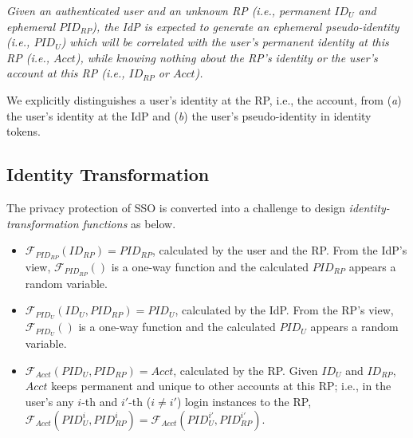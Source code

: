\emph{Given an authenticated user and an unknown RP (i.e., permanent $ID_U$ and ephemeral $PID_{RP}$),
    the IdP is expected to generate an ephemeral pseudo-identity (i.e., $PID_{U}$)
     which will be correlated with the user's permanent identity at this RP (i.e., $Acct$),
     while knowing nothing about the RP's identity or the user's account at this RP (i.e., $ID_{RP}$ or $Acct$).}


We explicitly distinguishes a user's identity at the RP, i.e., the account,
     from (\emph{a}) the user's identity at the IdP and (\emph{b}) the user's pseudo-identity in identity tokens.


\subsection{Identity Transformation}
\label{subsec:solutions}



The privacy protection of SSO is converted into a challenge
 to design \emph{identity-transformation functions} as below.
\vspace{-\topsep}\begin{itemize}
\setlength{\topsep}{0pt}
\setlength{\partopsep}{0pt}
\setlength{\itemsep}{0pt}
\setlength{\parsep}{0pt}
\setlength{\parskip}{0pt}
\item
$\mathcal{F}_{PID_{RP}}(ID_{RP}) = PID_{RP}$, calculated by the user and the RP.
From the IdP's view,
$\mathcal{F}_{PID_{RP}}()$ is a one-way function and the calculated $PID_{RP}$ appears a random variable.
\item
$\mathcal{F}_{PID_U}(ID_U, PID_{RP}) = PID_{U}$, calculated by the IdP.
From the RP's view,
    $\mathcal{F}_{PID_U}()$ is a one-way function and the calculated $PID_{U}$ appears a random variable.
\item
$\mathcal{F}_{Acct}(PID_{U}, PID_{RP}) = Acct$, calculated by the RP.
Given $ID_U$ and $ID_{RP}$, $Acct$ keeps permanent and unique to other accounts at this RP;
    i.e., in the user's any $i$-th and $i'$-th ($i \neq i'$) login instances to the RP,
 $\mathcal{F}_{Acct}(PID_{U}^i, PID_{RP}^i) = \mathcal{F}_{Acct}(PID_{U}^{i'}, PID_{RP}^{i'})$.
\end{itemize}

